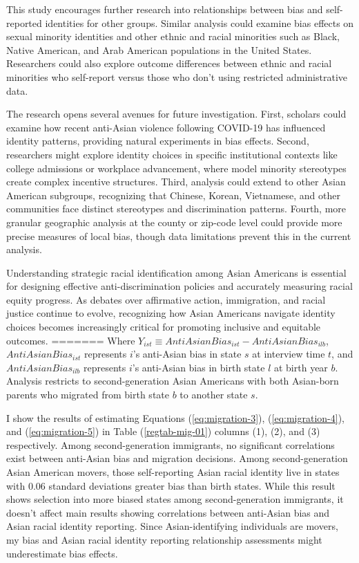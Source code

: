 This study encourages further research into relationships between bias and self-reported identities for other groups. Similar analysis could examine bias effects on sexual minority identities and other ethnic and racial minorities such as Black, Native American, and Arab American populations in the United States. Researchers could also explore outcome differences between ethnic and racial minorities who self-report versus those who don't using restricted administrative data.

The research opens several avenues for future investigation. First, scholars could examine how recent anti-Asian violence following COVID-19 has influenced identity patterns, providing natural experiments in bias effects. Second, researchers might explore identity choices in specific institutional contexts like college admissions or workplace advancement, where model minority stereotypes create complex incentive structures. Third, analysis could extend to other Asian American subgroups, recognizing that Chinese, Korean, Vietnamese, and other communities face distinct stereotypes and discrimination patterns. Fourth, more granular geographic analysis at the county or zip-code level could provide more precise measures of local bias, though data limitations prevent this in the current analysis.

Understanding strategic racial identification among Asian Americans is essential for designing effective anti-discrimination policies and accurately measuring racial equity progress. As debates over affirmative action, immigration, and racial justice continue to evolve, recognizing how Asian Americans navigate identity choices becomes increasingly critical for promoting inclusive and equitable outcomes.
=======
Where $Y_{ist} \equiv AntiAsianBias_{ist} - AntiAsianBias_{ilb}$, $AntiAsianBias_{ist}$ represents $i$'s anti-Asian bias in state $s$ at interview time $t$, and $AntiAsianBias_{ilb}$ represents $i$'s anti-Asian bias in birth state $l$ at birth year $b$. Analysis restricts to second-generation Asian Americans with both Asian-born parents who migrated from birth state $b$ to another state $s$.

I show the results of estimating Equations (\ref{eq:migration-3}), (\ref{eq:migration-4}), and (\ref{eq:migration-5}) in Table (\ref{regtab-mig-01}) columns (1), (2), and (3) respectively. Among second-generation immigrants, no significant correlations exist between anti-Asian bias and migration decisions. Among second-generation Asian American movers, those self-reporting Asian racial identity live in states with 0.06 standard deviations greater bias than birth states. While this result shows selection into more biased states among second-generation immigrants, it doesn't affect main results showing correlations between anti-Asian bias and Asian racial identity reporting. Since Asian-identifying individuals are movers, my bias and Asian racial identity reporting relationship assessments might underestimate bias effects.

